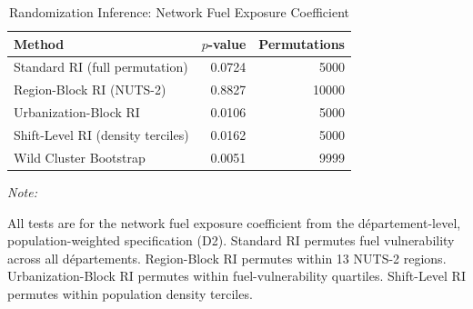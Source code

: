 \begin{table}[!h]
\centering
\caption{\label{tab:tab:ri_comparison}Randomization Inference: Network Fuel Exposure Coefficient}
\centering
\begin{threeparttable}
\begin{tabular}[t]{lrr}
\toprule
Method & $p$-value & Permutations\\
\midrule
Standard RI (full permutation) & 0.0724 & 5000\\
Region-Block RI (NUTS-2) & 0.8827 & 10000\\
Urbanization-Block RI & 0.0106 & 5000\\
Shift-Level RI (density terciles) & 0.0162 & 5000\\
Wild Cluster Bootstrap & 0.0051 & 9999\\
\bottomrule
\end{tabular}
\begin{tablenotes}
\item \textit{Note: } 
\item All tests are for the network fuel exposure coefficient from the département-level, population-weighted specification (D2). Standard RI permutes fuel vulnerability across all départements. Region-Block RI permutes within 13 NUTS-2 regions. Urbanization-Block RI permutes within fuel-vulnerability quartiles. Shift-Level RI permutes within population density terciles.
\end{tablenotes}
\end{threeparttable}
\end{table}
